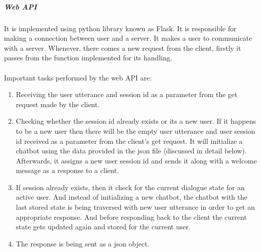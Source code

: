 \subparagraph*{Web API}
It is implemented using python library known as Flask. It is responsible for making a connection between user and a server. It makes a user to communicate with a server. Whenever, there comes a new request from the client, firstly it passes from the function implemented for its handling.
\\~\\
Important tasks performed by the web API are:
\begin{enumerate}
    \item Receiving the user utterance and session id as a parameter from the get request made by the client.
    \item Checking whether the session id already exists or its a new user. If it happens to be a new user then there will be the empty user utterance and user session id received as a parameter from the client's get request. It will initialize a chatbot using the data provided in the json file (discussed in detail below). Afterwards, it assigns a new user session id and sends it along with a welcome message as a response to a client.
    \item If session already exists, then it check for the current dialogue state for an active user. And instead of initializing a new chatbot, the chatbot with the last stored state is being traversed with new user utterance in order to get an appropriate response. And before responding back to the client the current state gets updated again and stored for the current user.
     \item The response is being sent as a json object.
\end{enumerate} 

